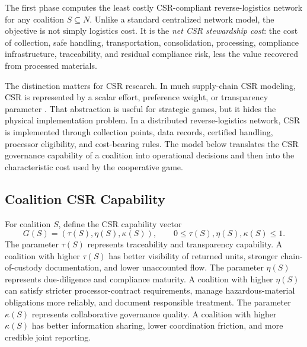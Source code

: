 The first phase computes the least costly CSR-compliant reverse-logistics network for any coalition $S\subseteq N$. Unlike a standard centralized network model, the objective is not simply logistics cost. It is the \emph{net CSR stewardship cost}: the cost of collection, safe handling, transportation, consolidation, processing, compliance infrastructure, traceability, and residual compliance risk, less the value recovered from processed materials.

The distinction matters for CSR research. In much supply-chain CSR modeling, CSR is represented by a scalar effort, preference weight, or transparency parameter \cite{Buccella2024,FantiBuccella2017,Ferrara2017,Khosroshahi2019,Mahdiraji2023}. That abstraction is useful for strategic games, but it hides the physical implementation problem. In a distributed reverse-logistics network, CSR is implemented through collection points, data records, certified handling, processor eligibility, and cost-bearing rules. The model below translates the CSR governance capability of a coalition into operational decisions and then into the characteristic cost used by the cooperative game.

\subsection{Coalition CSR Capability}

For coalition $S$, define the CSR capability vector
\begin{equation}
\label{eq:ch4_governance_vector}
G(S)=\left(\tau(S),\eta(S),\kappa(S)\right),
\qquad
0\leq \tau(S),\eta(S),\kappa(S)\leq 1.
\end{equation}
The parameter $\tau(S)$ represents traceability and transparency capability. A coalition with higher $\tau(S)$ has better visibility of returned units, stronger chain-of-custody documentation, and lower unaccounted flow. The parameter $\eta(S)$ represents due-diligence and compliance maturity. A coalition with higher $\eta(S)$ can satisfy stricter processor-contract requirements, manage hazardous-material obligations more reliably, and document responsible treatment. The parameter $\kappa(S)$ represents collaborative governance quality. A coalition with higher $\kappa(S)$ has better information sharing, lower coordination friction, and more credible joint reporting.

